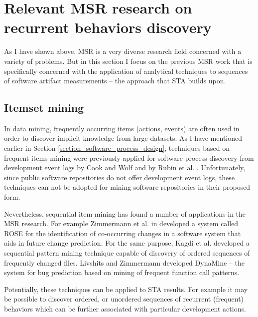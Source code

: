 \section{Relevant MSR research on recurrent behaviors discovery}
As I have shown above, MSR is a very diverse research field concerned with a variety of problems. 
But in this section I focus on the previous MSR work that is specifically concerned with the application of analytical 
techniques to sequences of software artifact measurements -- the approach that STA builds upon.

\subsection{Itemset mining}
In data mining, frequently occurring items (actions, events) are often used in order to discover implicit knowledge from
large datasets. As I have mentioned earlier in Section \ref{section_software_process_design}, techniques based on frequent
items mining were previously applied for software process discovery from development event logs 
by Cook and Wolf \cite{citeulike:328044} \cite{citeulike:5120757} \cite{citeulike:5128143} 
and by Rubin et al. \cite{citeulike:1885717}. Unfortunately, since public software repositories do not offer 
development event logs, these techniques can not be adopted for mining software repositories in their proposed form.

Nevertheless, sequential item mining has found a number of applications in the MSR research.
For example Zimmermann et al. in \cite{citeulike:277045} developed a system called ROSE for the identification of 
co-occurring changes in a software system that aids in future change prediction. 
For the same purpose, Kagdi et al. \cite{citeulike:3929070} developed a sequential pattern mining technique capable of 
discovery of ordered sequences of frequently changed files. 
Livshits and Zimmermann \cite{citeulike:393158} developed DynaMine -- the system for bug prediction based on mining 
of frequent function call patterns.

Potentially, these techniques can be applied to STA results. For example it may be possible to discover ordered, or
unordered sequences of recurrent (frequent) behaviors which can be further associated with particular development actions.

